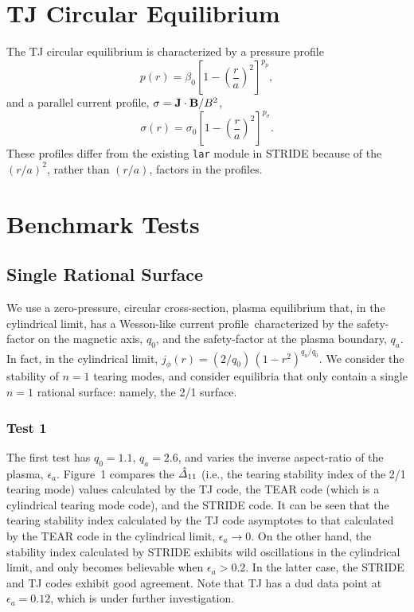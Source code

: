 \documentclass[12pt,prb,aps,notitlepage]{revtex4-1}
\begin{document}
\section{TJ Circular Equilibrium}
The TJ circular equilibrium is characterized by a pressure profile
\begin{equation}
p(r)= \beta_0\left[1-\left(\frac{r}{a}\right)^2\right]^{p_p},
\end{equation}
and a parallel current profile, $\sigma={\bf J}\cdot{\bf B}/B^2$, 
\begin{equation}
\sigma(r) = \sigma_0\left[1-\left(\frac{r}{a}\right)^2\right]^{p_\sigma}.
\end{equation}
These profiles differ from the existing {\tt lar} module in STRIDE because of the $(r/a)^2$, rather than $(r/a)$, factors in the profiles.

\section{Benchmark Tests}
\subsection{Single Rational Surface}
We use a zero-pressure, circular cross-section,  plasma equilibrium that, in the cylindrical limit, has a Wesson-like current profile\,\cite{wesson} characterized by the
safety-factor on the magnetic axis, $q_0$, and the safety-factor at the plasma boundary, $q_a$. In fact, in the cylindrical limit, $j_\phi(r)= (2/q_0)\, (1-r^2)^{q_a/q_0}$. 
We consider the stability of $n=1$ tearing modes, and
consider equilibria that only contain a single $n=1$ rational surface: namely, the 2/1 surface. 

\subsubsection{Test 1}
The first test has $q_0=1.1$, $q_a=2.6$, and varies the inverse aspect-ratio of the plasma, $\epsilon_a$. Figure~1 compares the $\hat{\mit\Delta}_{11}$ (i.e.,
the tearing stability index of the 2/1 tearing mode) values calculated by the TJ code,\cite{tj} the TEAR code (which is a cylindrical tearing mode code), and
the STRIDE code. It can be seen that the tearing stability index calculated by the TJ code asymptotes to that calculated by the TEAR code
in the cylindrical limit, $\epsilon_a\rightarrow 0$. On the other hand, the stability index calculated by STRIDE exhibits wild oscillations in
the cylindrical limit, and only becomes believable when $\epsilon_a>0.2$. In the latter case, the STRIDE and TJ codes exhibit good agreement. 
Note that TJ has a dud data point at $\epsilon_a=0.12$, which is under further investigation. 
\end{document}
